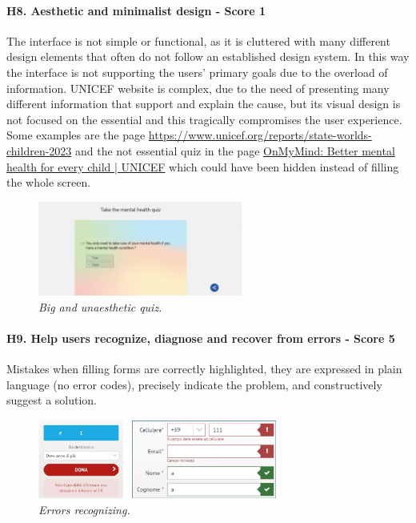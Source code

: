 \newline
\newline \paragraph{H8. Aesthetic and minimalist design - Score 1} \label{subsec:H8}	The interface is not simple or functional, as it is cluttered with many different design elements that often do not follow an established design system. In this way the interface is not supporting the users’ primary goals due to the overload of information.
\newline UNICEF website is complex, due to the need of presenting many different information that support and explain the cause, but its visual design is not focused on the essential and this tragically compromises the user experience.
\newline Some examples are the page \href{https://www.unicef.org/reports/state-worlds-children-2023}{https://www.unicef.org/reports/state-worlds-children-2023} and the not essential quiz in the page \href{https://www.unicef.org/on-my-mind}{OnMyMind: Better mental health for every child | UNICEF} which could have been hidden instead of filling the whole screen. 
\begin{figure}[!h]
	\begin{center}
		\includegraphics[width=0.6\textwidth]{FinalScores14.jpg}
		\captionsetup{font=small}
		\caption{\textit{Big and unaesthetic quiz.}}
	\end{center}
\end{figure}
\newline
\newline \paragraph{H9. Help users recognize, diagnose and recover from errors - Score 5} \label{subsec:H9}	Mistakes when filling forms are correctly highlighted, they are expressed in plain language (no error codes), precisely indicate the problem, and constructively suggest a solution.
\begin{figure}[!h]
	\begin{center}
		\includegraphics[width=0.7\textwidth]{FinalScores15.jpg}
		\captionsetup{font=small}
		\caption{\textit{Errors recognizing.}}
	\end{center}
\end{figure}
